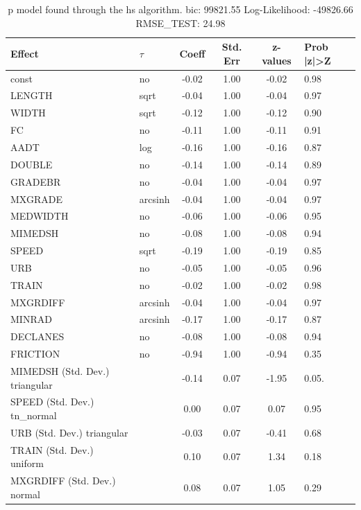 \begin{table}
	\caption{p model found through the hs algorithm. bic: 99821.55 Log-Likelihood: -49826.66 RMSE_TEST: 24.98}
	\begin{center}
		\begin{tabular}{|l|l|c|c|c|l|}
			\hline
			Effect & $\tau$ & Coeff & Std. Err & z-values & Prob |z|>Z \\
			\hline
			const & no & -0.02 & 1.00 & -0.02 & 0.98 \\
			\hline
			LENGTH & sqrt & -0.04 & 1.00 & -0.04 & 0.97 \\
			\hline
			WIDTH & sqrt & -0.12 & 1.00 & -0.12 & 0.90 \\
			\hline
			FC & no & -0.11 & 1.00 & -0.11 & 0.91 \\
			\hline
			AADT & log & -0.16 & 1.00 & -0.16 & 0.87 \\
			\hline
			DOUBLE & no & -0.14 & 1.00 & -0.14 & 0.89 \\
			\hline
			GRADEBR & no & -0.04 & 1.00 & -0.04 & 0.97 \\
			\hline
			MXGRADE & arcsinh & -0.04 & 1.00 & -0.04 & 0.97 \\
			\hline
			MEDWIDTH & no & -0.06 & 1.00 & -0.06 & 0.95 \\
			\hline
			MIMEDSH & no & -0.08 & 1.00 & -0.08 & 0.94 \\
			\hline
			SPEED & sqrt & -0.19 & 1.00 & -0.19 & 0.85 \\
			\hline
			URB & no & -0.05 & 1.00 & -0.05 & 0.96 \\
			\hline
			TRAIN & no & -0.02 & 1.00 & -0.02 & 0.98 \\
			\hline
			MXGRDIFF & arcsinh & -0.04 & 1.00 & -0.04 & 0.97 \\
			\hline
			MINRAD & arcsinh & -0.17 & 1.00 & -0.17 & 0.87 \\
			\hline
			DECLANES & no & -0.08 & 1.00 & -0.08 & 0.94 \\
			\hline
			FRICTION & no & -0.94 & 1.00 & -0.94 & 0.35 \\
			\hline
			MIMEDSH (Std. Dev.) triangular &  & -0.14 & 0.07 & -1.95 & 0.05. \\
			\hline
			SPEED (Std. Dev.) tn_normal &  & 0.00 & 0.07 & 0.07 & 0.95 \\
			\hline
			URB (Std. Dev.) triangular &  & -0.03 & 0.07 & -0.41 & 0.68 \\
			\hline
			TRAIN (Std. Dev.) uniform &  & 0.10 & 0.07 & 1.34 & 0.18 \\
			\hline
			MXGRDIFF (Std. Dev.) normal &  & 0.08 & 0.07 & 1.05 & 0.29 \\

\end{tabular}
\end{center}
\end{table}
